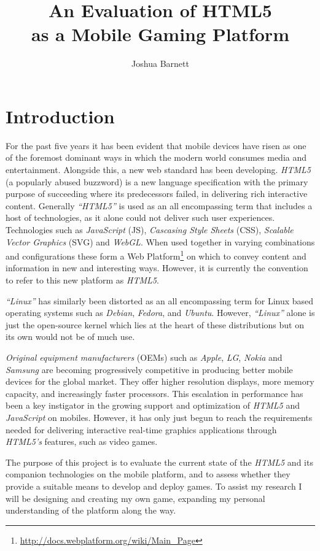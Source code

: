 \documentclass[final]{cmpreport}
\title{An Evaluation of HTML5\\as a Mobile Gaming Platform}
\author{Joshua Barnett}
\begin{document}
\section{Introduction}
For the past five years it has been evident that mobile devices have risen as one of the foremost dominant ways in which the modern world consumes media and entertainment. Alongside this, a new web standard has been developing. \textit{HTML5} (a popularly abused buzzword) is a new language specification with the primary purpose of succeeding where its predecessors failed, in delivering rich interactive content. Generally \textit{``HTML5''} is used as an all encompassing term that includes a host of technologies, as it alone could not deliver such user experiences. Technologies such as \textit{JavaScript} (JS), \textit{Cascasing Style Sheets} (CSS), \textit{Scalable Vector Graphics} (SVG) and \textit{WebGL}. When used together in varying combinations and configurations these form a Web Platform\footnote{\url{http://docs.webplatform.org/wiki/Main_Page}} on which to convey content and information in new and interesting ways. However, it is currently the convention to refer to this new platform as \textit{HTML5}.

\textit{``Linux''} has similarly been distorted as an all encompassing term for Linux based operating systems such as \textit{Debian}, \textit{Fedora}, and \textit{Ubuntu}. However, \textit{``Linux''} alone is just the open-source kernel which lies at the heart of these distributions but on its own would not be of much use.

\textit{Original equipment manufacturers} (OEMs) such as \textit{Apple}, \textit{LG}, \textit{Nokia} and \textit{Samsung} are becoming progressively competitive in producing better mobile devices for the global market. They offer higher resolution displays, more memory capacity, and increasingly faster processors. This escalation in performance has been a key instigator in the growing support and optimization of \textit{HTML5} and \textit{JavaScript} on mobiles. However, it has only just begun to reach the requirements needed for delivering interactive real-time graphics applications through \textit{HTML5's} features, such as video games.

The purpose of this project is to evaluate the current state of the \textit{HTML5} and its companion technologies on the mobile platform, and to assess whether they provide a suitable means to develop and deploy games. To assist my research I will be designing and creating my own game, expanding my personal understanding of the platform along the way.
\end{document}
